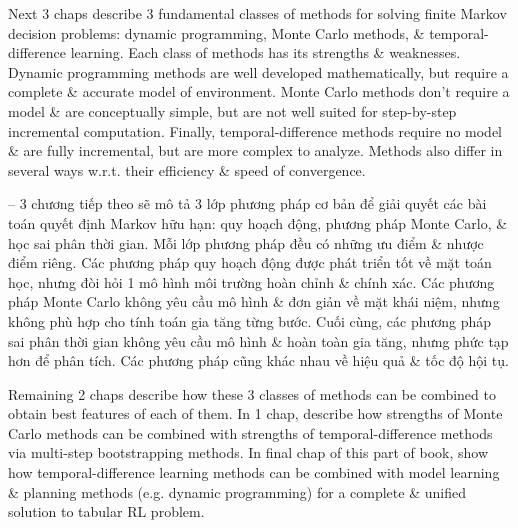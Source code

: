 \documentclass{article}
\begin{document}
\begin{itemize}
    Next 3 chaps describe 3 fundamental classes of methods for solving finite Markov decision problems: dynamic programming, Monte Carlo methods, \& temporal-difference learning. Each class of methods has its strengths \& weaknesses. Dynamic programming methods are well developed mathematically, but require a complete \& accurate model of environment. Monte Carlo methods don't require a model \& are conceptually simple, but are not well suited for step-by-step incremental computation. Finally, temporal-difference methods require no model \& are fully incremental, but are more complex to analyze. Methods also differ in several ways w.r.t. their efficiency \& speed of convergence.

    -- 3 chương tiếp theo sẽ mô tả 3 lớp phương pháp cơ bản để giải quyết các bài toán quyết định Markov hữu hạn: quy hoạch động, phương pháp Monte Carlo, \& học sai phân thời gian. Mỗi lớp phương pháp đều có những ưu điểm \& nhược điểm riêng. Các phương pháp quy hoạch động được phát triển tốt về mặt toán học, nhưng đòi hỏi 1 mô hình môi trường hoàn chỉnh \& chính xác. Các phương pháp Monte Carlo không yêu cầu mô hình \& đơn giản về mặt khái niệm, nhưng không phù hợp cho tính toán gia tăng từng bước. Cuối cùng, các phương pháp sai phân thời gian không yêu cầu mô hình \& hoàn toàn gia tăng, nhưng phức tạp hơn để phân tích. Các phương pháp cũng khác nhau về hiệu quả \& tốc độ hội tụ.

    Remaining 2 chaps describe how these 3 classes of methods can be combined to obtain best features of each of them. In 1 chap, describe how strengths of Monte Carlo methods can be combined with strengths of temporal-difference methods via multi-step bootstrapping methods. In final chap of this part of book, show how temporal-difference learning methods can be combined with model learning \& planning methods (e.g. dynamic programming) for a complete \& unified solution to tabular RL problem.


\end{itemize}
\end{document}
